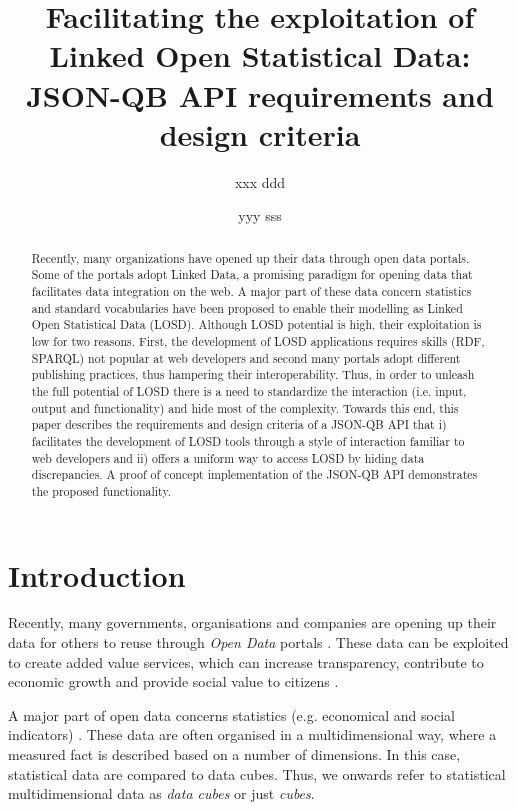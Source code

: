 \documentclass{llncs}
\begin{document}
\title{Facilitating the exploitation of Linked Open Statistical Data: JSON-QB API requirements and design criteria}

\author{xxx ddd \and yyy sss}

\maketitle

\begin{abstract}
Recently, many organizations have opened up their data through open data portals. Some of the portals adopt Linked Data, a promising paradigm for opening data that facilitates data integration on the web. A major part of these data concern statistics and standard vocabularies have been proposed to enable their modelling as Linked Open Statistical Data (LOSD). Although LOSD potential is high, their exploitation is low for two reasons. First, the development of LOSD applications requires skills (RDF, SPARQL) not popular at web developers and second many portals adopt different publishing practices, thus hampering their interoperability. Thus, in order to unleash the full potential of LOSD there is a need to standardize the interaction (i.e. input, output and functionality) and hide most of the complexity. Towards this end, this paper describes the requirements and design criteria of a JSON-QB API that i) facilitates the development of LOSD tools through a style of interaction familiar to web developers and ii) offers a uniform way to access LOSD by hiding data discrepancies. A proof of concept implementation of the JSON-QB API demonstrates the proposed functionality.
\end{abstract}

\section{Introduction}\label{sec:intro}

Recently, many governments, organisations and companies are opening up their data for others to reuse through \textit{Open Data} portals  \cite{Kalampokis:2011:IJWET}. These data can be exploited to create added value services, which can increase transparency, contribute to economic growth and provide social value to citizens \cite{Janssen:2012}.

A major part of open data concerns statistics (e.g. economical and social indicators) \cite{Capadisli:2013}. These data are often organised in a multidimensional way, where a measured fact is described based on a number of dimensions. In this case, statistical data are compared to data cubes. Thus, we onwards refer to statistical multidimensional data as \textit{data cubes} or just \textit{cubes}.
\end{document}
